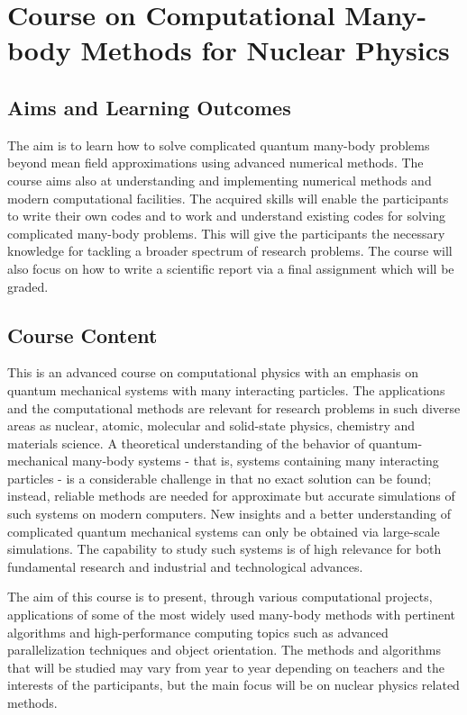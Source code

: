 \documentclass[prc,amsart,english]{revtex4}
\begin{document}
\section{Course on Computational Many-body Methods for Nuclear Physics}

\subsection{Aims and Learning Outcomes}
The aim is to learn how to solve complicated  quantum many-body problems
beyond mean field approximations using advanced numerical methods. The course aims also at understanding and implementing
numerical methods and modern computational facilities.  The acquired skills will enable the participants to write their own
codes and to work and understand existing codes for solving complicated many-body problems.
This will give the participants the necessary knowledge for tackling  a broader spectrum of research problems.
The course will also focus on how to write a scientific report via a final assignment which will be graded.
\subsection{Course Content}
This is an advanced course on computational physics with an emphasis on quantum mechanical
systems with many interacting particles. The applications and the computational methods are
relevant for research problems in such diverse areas as nuclear, atomic, molecular and solid-state physics, chemistry and materials science.
A theoretical understanding of the behavior of quantum-mechanical many-body systems - that is, systems containing many interacting particles - is a considerable challenge in that no exact solution can be found; instead, reliable methods are needed for approximate but accurate simulations of such systems on modern computers. New insights and a better understanding of complicated quantum mechanical systems can only be obtained via large-scale simulations. The capability to study such systems is of high relevance for both fundamental research and industrial and technological advances.

The aim of this course is to present, through various computational projects, applications of some of the most widely used many-body methods with pertinent algorithms and high-performance computing topics such as advanced parallelization techniques and object orientation. The methods and algorithms that will be studied may vary from year to year depending on teachers and the interests of the participants, but the main focus will be on nuclear physics related methods.
\end{document}
